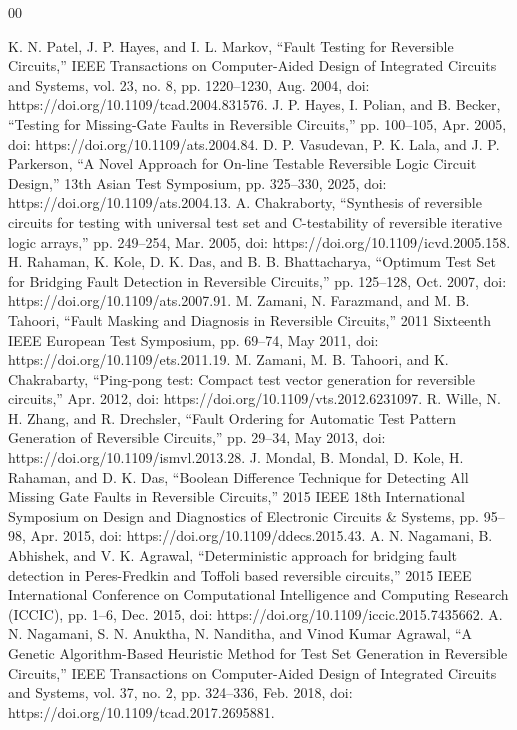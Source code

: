 \documentclass[conference]{IEEEtran}
\begin{document}
\begin{thebibliography}{00}

K. N. Patel, J. P. Hayes, and I. L. Markov, “Fault Testing for Reversible Circuits,” IEEE Transactions on Computer-Aided Design of Integrated Circuits and Systems, vol. 23, no. 8, pp. 1220–1230, Aug. 2004, doi: https://doi.org/10.1109/tcad.2004.831576.
J. P. Hayes, I. Polian, and B. Becker, “Testing for Missing-Gate Faults in Reversible Circuits,” pp. 100–105, Apr. 2005, doi: https://doi.org/10.1109/ats.2004.84.
D. P. Vasudevan, P. K. Lala, and J. P. Parkerson, “A Novel Approach for On-line Testable Reversible Logic Circuit Design,” 13th Asian Test Symposium, pp. 325–330, 2025, doi: https://doi.org/10.1109/ats.2004.13.
A. Chakraborty, “Synthesis of reversible circuits for testing with universal test set and C-testability of reversible iterative logic arrays,” pp. 249–254, Mar. 2005, doi: https://doi.org/10.1109/icvd.2005.158.
H. Rahaman, K. Kole, D. K. Das, and B. B. Bhattacharya, “Optimum Test Set for Bridging Fault Detection in Reversible Circuits,” pp. 125–128, Oct. 2007, doi: https://doi.org/10.1109/ats.2007.91.
M. Zamani, N. Farazmand, and M. B. Tahoori, “Fault Masking and Diagnosis in Reversible Circuits,” 2011 Sixteenth IEEE European Test Symposium, pp. 69–74, May 2011, doi: https://doi.org/10.1109/ets.2011.19.
M. Zamani, M. B. Tahoori, and K. Chakrabarty, “Ping-pong test: Compact test vector generation for reversible circuits,” Apr. 2012, doi: https://doi.org/10.1109/vts.2012.6231097.
R. Wille, N. H. Zhang, and R. Drechsler, “Fault Ordering for Automatic Test Pattern Generation of Reversible Circuits,” pp. 29–34, May 2013, doi: https://doi.org/10.1109/ismvl.2013.28.
J. Mondal, B. Mondal, D. Kole, H. Rahaman, and D. K. Das, “Boolean Difference Technique for Detecting All Missing Gate Faults in Reversible Circuits,” 2015 IEEE 18th International Symposium on Design and Diagnostics of Electronic Circuits \& Systems, pp. 95–98, Apr. 2015, doi: https://doi.org/10.1109/ddecs.2015.43.
A. N. Nagamani, B. Abhishek, and V. K. Agrawal, “Deterministic approach for bridging fault detection in Peres-Fredkin and Toffoli based reversible circuits,” 2015 IEEE International Conference on Computational Intelligence and Computing Research (ICCIC), pp. 1–6, Dec. 2015, doi: https://doi.org/10.1109/iccic.2015.7435662.
 A. N. Nagamani, S. N. Anuktha, N. Nanditha, and Vinod Kumar Agrawal, “A Genetic Algorithm-Based Heuristic Method for Test Set Generation in Reversible Circuits,” IEEE Transactions on Computer-Aided Design of Integrated Circuits and Systems, vol. 37, no. 2, pp. 324–336, Feb. 2018, doi: https://doi.org/10.1109/tcad.2017.2695881.

\end{thebibliography}
\end{document}
